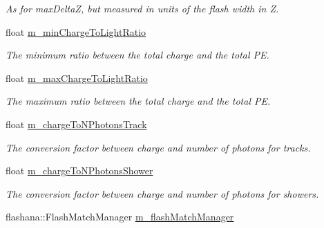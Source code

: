 \begin{DoxyCompactItemize}
\begin{DoxyCompactList}\small\item\em As for max\+DeltaZ, but measured in units of the flash width in Z. \end{DoxyCompactList}\item 
float \hyperlink{classflashmatch_1_1FlashMatchingTool_ab4b223f8fca98bb3e6372762228b3065}{m\+\_\+min\+Charge\+To\+Light\+Ratio}\hypertarget{classflashmatch_1_1FlashMatchingTool_ab4b223f8fca98bb3e6372762228b3065}{}\label{classflashmatch_1_1FlashMatchingTool_ab4b223f8fca98bb3e6372762228b3065}

\begin{DoxyCompactList}\small\item\em The minimum ratio between the total charge and the total PE. \end{DoxyCompactList}\item 
float \hyperlink{classflashmatch_1_1FlashMatchingTool_a2f5ba137ceabb7e78a992db8f66ff0ad}{m\+\_\+max\+Charge\+To\+Light\+Ratio}\hypertarget{classflashmatch_1_1FlashMatchingTool_a2f5ba137ceabb7e78a992db8f66ff0ad}{}\label{classflashmatch_1_1FlashMatchingTool_a2f5ba137ceabb7e78a992db8f66ff0ad}

\begin{DoxyCompactList}\small\item\em The maximum ratio between the total charge and the total PE. \end{DoxyCompactList}\item 
float \hyperlink{classflashmatch_1_1FlashMatchingTool_a89d4a6c3dae8a3a8aa0db8c0c9a0cb21}{m\+\_\+charge\+To\+N\+Photons\+Track}\hypertarget{classflashmatch_1_1FlashMatchingTool_a89d4a6c3dae8a3a8aa0db8c0c9a0cb21}{}\label{classflashmatch_1_1FlashMatchingTool_a89d4a6c3dae8a3a8aa0db8c0c9a0cb21}

\begin{DoxyCompactList}\small\item\em The conversion factor between charge and number of photons for tracks. \end{DoxyCompactList}\item 
float \hyperlink{classflashmatch_1_1FlashMatchingTool_ab914c01e557cee0b0dd0c461759e7135}{m\+\_\+charge\+To\+N\+Photons\+Shower}\hypertarget{classflashmatch_1_1FlashMatchingTool_ab914c01e557cee0b0dd0c461759e7135}{}\label{classflashmatch_1_1FlashMatchingTool_ab914c01e557cee0b0dd0c461759e7135}

\begin{DoxyCompactList}\small\item\em The conversion factor between charge and number of photons for showers. \end{DoxyCompactList}\item 
flashana\+::\+Flash\+Match\+Manager \hyperlink{classflashmatch_1_1FlashMatchingTool_a11b980eee1a9ecbe15663af51885846d}{m\+\_\+flash\+Match\+Manager}\hypertarget{classflashmatch_1_1FlashMatchingTool_a11b980eee1a9ecbe15663af51885846d}{}\label{classflashmatch_1_1FlashMatchingTool_a11b980eee1a9ecbe15663af51885846d}


\end{DoxyCompactItemize}

